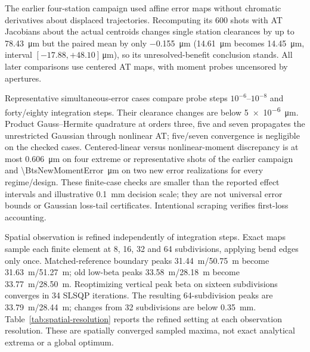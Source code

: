 \documentclass[10pt,a4paper]{article}
\begin{document}
The earlier four-station campaign used affine error maps without chromatic
derivatives about displaced trajectories. Recomputing its 600 shots with AT Jacobians
about the actual centroids changes single station clearances by up to
\SI{78.43}{\micro\metre} but the paired mean by only \SI{-0.155}{\micro\metre} (\SI{14.61}{\micro\metre} becomes
\SI{14.45}{\micro\metre}, interval $[-17.88,+48.10]$\,\si{\micro\metre}), so its unresolved-benefit
conclusion stands. All later comparisons use centered AT maps, with moment probes
uncensored by apertures.

Representative simultaneous-error cases compare probe steps $10^{-6}$--$10^{-8}$
and forty/eighty integration steps. Their clearance changes are below
\SI{5e-6}{\micro\metre}. Product Gauss--Hermite quadrature at orders three,
five and seven propagates the unrestricted Gaussian through nonlinear AT;
five/seven convergence is negligible on the checked cases. Centered-linear versus
nonlinear-moment discrepancy is at most \SI{0.606}{\micro\metre} on four extreme
or representative shots of the earlier campaign and \SI{\BtsNewMomentError}{\micro\metre} on two new error realizations
for every regime/design. These finite-case checks are smaller than the reported
effect intervals and illustrative \SI{0.1}{\milli\metre} decision scale; they are not universal
error bounds or Gaussian loss-tail certificates. Intentional scraping verifies
first-loss accounting.

Spatial observation is refined independently of integration steps. Exact maps
sample each finite element at 8, 16, 32 and 64 subdivisions, applying bend edges
only once. Matched-reference boundary peaks \SI{31.44}{\metre}/\SI{50.75}{\metre} become \SI{31.63}{\metre}/\SI{51.27}{\metre};
old low-beta peaks \SI{33.58}{\metre}/\SI{28.18}{\metre} become \SI{33.77}{\metre}/\SI{28.50}{\metre}. Reoptimizing vertical peak
beta on sixteen subdivisions converges in 34 SLSQP iterations. The resulting
64-subdivision peaks are \SI{33.79}{\metre}/\SI{28.44}{\metre}; changes from 32 subdivisions are below
\SI{0.35}{\milli\metre}. Table~\ref{tab:spatial-resolution} reports the refined setting at each observation resolution.
These are spatially converged sampled maxima, not exact analytical
extrema or a global optimum. 

\begin{table}[htbp]\centering
\caption{Numerical accuracy checks for the nominal transport and selected error
cases. Map-entry discrepancies use the stated SI coordinate convention.
The final four rows are finite-case convergence diagnostics, not universal
error bounds or Gaussian loss-tail tolerances.}\label{tab:accuracy}

\end{table}
\end{document}
